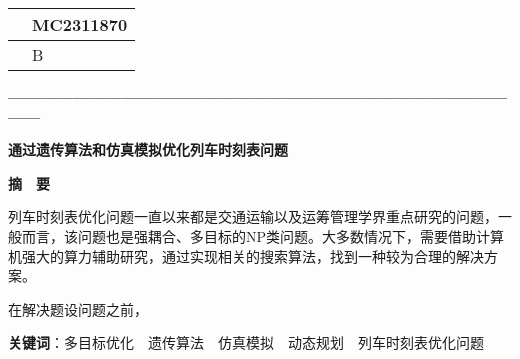 \thispagestyle{empty}   %

\begin{table}[]
    \centering
    \renewcommand\arraystretch{2}
    \begin{tabular}{|l|l|}
    \hline
    \quad & MC2311870\quad \\ \hline
       & B         \\ \hline
    \end{tabular}
\end{table}



\begin{center}
    \textbf{—————————————————————————————————}

    \textbf{\fontsize{20}{1.5}通过遗传算法和仿真模拟优化列车时刻表问题}

    \textbf{摘　要}
\end{center}





%
%

列车时刻表优化问题一直以来都是交通运输以及运筹管理学界重点研究的问题，一般而言，该问题也是强耦合、多目标的NP类问题。大多数情况下，需要借助计算机强大的算力辅助研究，通过实现相关的搜索算法，找到一种较为合理的解决方案\cite{niuGuidaoliecheshikebiaowentiyanjiuzongshu2021}。

在解决题设问题之前，

\textbf{关键词}：多目标优化　遗传算法　仿真模拟　动态规划　列车时刻表优化问题




%
%

\newpage
\tableofcontents
\thispagestyle{empty}
